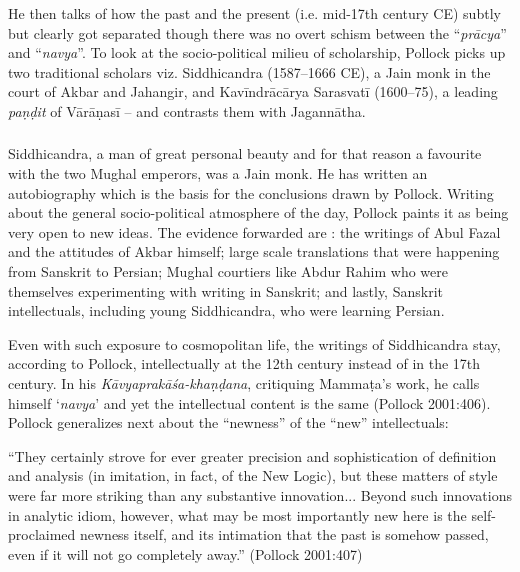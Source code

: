\subsubsection{} He then talks of how the past and the present (i.e. mid-17th century CE) subtly but clearly got separated though there was no overt schism between the “{\sl prācya}” and “{\sl navya}”. To look at the socio-political milieu of scholarship, Pollock picks up two traditional scholars viz. Siddhicandra (1587--1666 CE), a Jain monk in the court of Akbar and Jahangir, and Kavīndrācārya Sarasvatī (1600--75), a leading {\sl paṇḍit} of Vārāṇasī -- and contrasts them with Jagannātha.

\subsubsection{} Siddhicandra, a man of great personal beauty and for that reason a favourite with the two Mughal emperors, was a Jain monk. He has written an autobiography which is the basis for the conclusions drawn by Pollock. Writing about the general socio-political atmosphere of the day, Pollock paints it as being very open to new ideas. The evidence forwarded are : the writings of Abul Fazal and the attitudes of Akbar himself; large scale translations that were happening from Sanskrit to Persian; Mughal courtiers like Abdur Rahim who were themselves experimenting with writing in Sanskrit; and lastly, Sanskrit intellectuals, including young Siddhicandra, who were learning Persian.

Even with such exposure to cosmopolitan life, the writings of Siddhicandra stay, according to Pollock, intellectually at the 12th century instead of in the 17th century. In his {\sl Kāvyaprakāśa-khaṇḍana}, critiquing Mammaṭa’s work, he calls himself ‘{\sl navya}’ and yet the intellectual content is the same (Pollock 2001:406). Pollock generalizes next about the “newness” of the “new” intellectuals:
\begin{myquote}
\eleven
“They certainly strove for ever greater precision and sophistication of definition and analysis (in imitation, in fact, of the New Logic), but these matters of style were far more striking than any substantive innovation... Beyond such innovations in analytic idiom, however, what may be most importantly new here is the self-proclaimed newness itself, and its intimation that the past is somehow passed, even if it will not go completely away.” \hfill(Pollock 2001:407)
\end{myquote}

